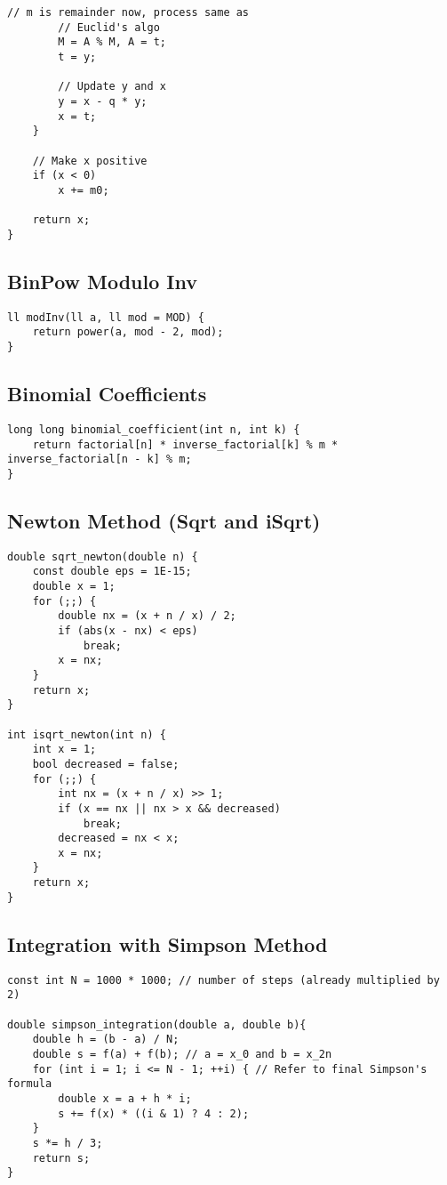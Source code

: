 \documentclass[10pt]{article}
\begin{document}
\begin{multicols*}{2}
\begin{lstlisting}[style=compactcpp]
        // m is remainder now, process same as
        // Euclid's algo
        M = A % M, A = t;
        t = y;

        // Update y and x
        y = x - q * y;
        x = t;
    }

    // Make x positive
    if (x < 0)
        x += m0;

    return x;
}
\end{lstlisting}

\subsection{BinPow Modulo Inv}
\begin{lstlisting}
ll modInv(ll a, ll mod = MOD) {
    return power(a, mod - 2, mod);
}

\end{lstlisting}
\subsection{Binomial Coefficients}
\begin{lstlisting}[style=compactcpp]
long long binomial_coefficient(int n, int k) {
    return factorial[n] * inverse_factorial[k] % m * inverse_factorial[n - k] % m;
}
\end{lstlisting}
\subsection{Newton Method (Sqrt and iSqrt)}
\begin{lstlisting}[style=compactcpp]
double sqrt_newton(double n) {
    const double eps = 1E-15;
    double x = 1;
    for (;;) {
        double nx = (x + n / x) / 2;
        if (abs(x - nx) < eps)
            break;
        x = nx;
    }
    return x;
}

int isqrt_newton(int n) {
    int x = 1;
    bool decreased = false;
    for (;;) {
        int nx = (x + n / x) >> 1;
        if (x == nx || nx > x && decreased)
            break;
        decreased = nx < x;
        x = nx;
    }
    return x;
}
\end{lstlisting}
\subsection{Integration with Simpson Method}
\begin{lstlisting}[style=compactcpp]
const int N = 1000 * 1000; // number of steps (already multiplied by 2)

double simpson_integration(double a, double b){
    double h = (b - a) / N;
    double s = f(a) + f(b); // a = x_0 and b = x_2n
    for (int i = 1; i <= N - 1; ++i) { // Refer to final Simpson's formula
        double x = a + h * i;
        s += f(x) * ((i & 1) ? 4 : 2);
    }
    s *= h / 3;
    return s;
}
\end{lstlisting}

\end{multicols*}
\end{document}

